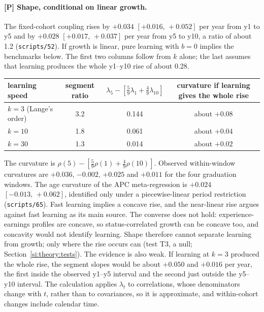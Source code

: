 \documentclass[11pt]{article}
\newcommand{\ci}[2]{$[#1,\allowbreak\,#2]$}
\begin{document}
\paragraph{[P] Shape, conditional on linear growth.} The fixed-cohort coupling rises by $+0.034$
\ci{+0.016}{+0.052} per year from y1 to y5 and by $+0.028$ \ci{+0.017}{+0.037} per year from y5 to y10, a ratio of
about 1.2 (\texttt{scripts/52}). If growth is linear, pure learning with $b=0$ implies the benchmarks below. The
first two columns follow from $k$ alone; the last assumes that learning produces the whole y1--y10 rise of about
0.28.

\medskip
\begin{center}
\small
\begin{tabular}{@{}lccc@{}}
\toprule
learning speed & segment ratio & $\lambda_5-[\tfrac59\lambda_1+\tfrac49\lambda_{10}]$ &
curvature if learning gives the whole rise\\
\midrule
$k=3$ (Lange's order) & 3.2 & 0.144 & about $+0.08$\\
$k=10$ & 1.8 & 0.061 & about $+0.04$\\
$k=30$ & 1.3 & 0.014 & about $+0.02$\\
\bottomrule
\end{tabular}
\end{center}
\medskip

\noindent The curvature is $\rho(5)-[\tfrac59\rho(1)+\tfrac49\rho(10)]$. Observed within-window curvatures are
$+0.036$, $-0.002$, $+0.025$ and $+0.011$ for the four graduation windows. The age curvature of the APC
meta-regression is $+0.024$ \ci{-0.013}{+0.062}, identified only under a piecewise-linear period restriction
(\texttt{scripts/65}). Fast learning implies a concave rise, and the near-linear rise argues against fast learning
as its main source. The converse does not hold: experience-earnings profiles are concave, so status-correlated
growth can be concave too, and concavity would not identify learning. Shape therefore cannot separate learning from growth; only where the rise occurs can (test T3, a null;
Section~\ref{si:theory:tests}). The evidence is also weak. If learning at $k=3$ produced the whole
rise, the segment slopes would be about $+0.050$ and $+0.016$ per year, the first inside the observed y1--y5
interval and the second just outside the y5--y10 interval. The calculation applies $\lambda_t$ to correlations,
whose denominators change with $t$, rather than to covariances, so it is approximate, and within-cohort changes
include calendar time.
\end{document}
